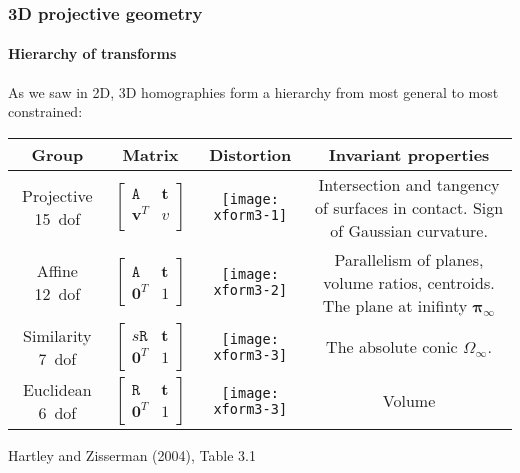 \documentclass[aspectratio=169]{beamer}
\renewcommand{\vec}[1]{\boldsymbol{#1}}
\newcommand{\mat}[1]{\mathtt{#1}}
\begin{document}
\begin{frame}
\frametitle{3D projective geometry}
\framesubtitle{Hierarchy of transforms}

As we saw in 2D, 3D homographies form a hierarchy from most general to
most constrained:

{\small
\begin{tabular}{cccc}
\hline
\hline
Group & Matrix & Distortion & Invariant properties \\
\hline
\begin{minipage}{0.5in} Projective 15~dof \end{minipage} &
$\begin{bmatrix}\mat{A} & \vec{t} \\
                \vec{v}^T & v \\ \end{bmatrix}$ &
\parbox{0.5in}{\centerline{\texttt{[image: xform3-1]}}} &
\begin{minipage}{1.8in} Intersection and tangency of surfaces in contact.
Sign of Gaussian curvature. \end{minipage} \\
\hline
\begin{minipage}{0.5in} Affine 12~dof \end{minipage} &
$\begin{bmatrix}\mat{A} & \vec{t} \\
                \vec{0}^T & 1 \end{bmatrix}$ &
\parbox{0.5in}{\centerline{\texttt{[image: xform3-2]}}} &
\begin{minipage}{1.8in} Parallelism of planes, volume ratios,
  centroids.  The plane at inifinty $\vec{\pi}_{\infty}$ \end{minipage} \\
\hline
\begin{minipage}{0.5in} Similarity 7~dof \end{minipage} &
$\begin{bmatrix}s\mat{R} & \vec{t} \\
                \vec{0}^T & 1 \end{bmatrix}$ &
\parbox{0.5in}{\centerline{\texttt{[image: xform3-3]}}} &
\begin{minipage}{1.8in} The absolute conic $\mat{\Omega}_{\infty}$.
 \end{minipage} \\
\hline
\begin{minipage}{0.5in} Euclidean 6~dof \end{minipage} &
$\begin{bmatrix} \mat{R} & \vec{t} \\
                \vec{0}^T & 1 \end{bmatrix}$ &
\parbox{0.5in}{\centerline{\texttt{[image: xform3-3]}}} &
\begin{minipage}{1.8in} Volume \end{minipage} \\
\hline
\hline
\end{tabular}}

\centerline{\scriptsize Hartley and Zisserman (2004), Table 3.1}  

\end{frame}
\end{document}
